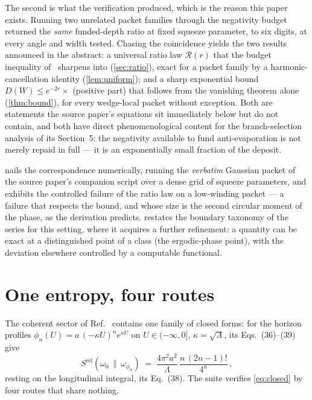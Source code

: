 \documentclass[11pt,a4paper]{article}
\newcommand{\Srel}{S^{\mathrm{rel}}}
\theoremstyle{plain}
\theoremstyle{definition}
\begin{document}
The second is what the verification produced, which is the reason this paper
exists. Running two unrelated packet families through the negativity budget
returned the \emph{same} funded-depth ratio at fixed squeeze parameter, to
six digits, at every angle and width tested. Chasing the coincidence yields
the two results announced in the abstract: a universal ratio law
$\mathcal{R}(r)$ that the budget inequality of~\cite{NariaiI} sharpens into
(\cref{sec:ratio}), exact for a packet family by a harmonic-cancellation
identity (\cref{lem:uniform}); and a sharp exponential bound
$D(W) \le e^{-2r} \times$ (positive part) that follows from the vanishing
theorem alone (\cref{thm:bound}), for every wedge-local packet without
exception. Both are statements the source paper's equations sit immediately
below but do not contain, and both have direct phenomenological content for
the branch-selection analysis of its Section~5: the negativity available to
fund anti-evaporation is not merely repaid in full --- it is an exponentially
small fraction of the deposit.

 nails the correspondence numerically, running the
\emph{verbatim} Gaussian packet of the source paper's companion script over a
dense grid of squeeze parameters, and exhibits the controlled failure of the
ratio law on a low-winding packet --- a failure that respects the bound, and
whose size is the second circular moment of the phase, as the derivation
predicts.  restates the boundary taxonomy of the series
for this setting, where it acquires a further refinement: a quantity can be
exact at a distinguished point of a class (the ergodic-phase point), with the
deviation elsewhere controlled by a computable functional.


\section{One entropy, four routes}
\label{sec:routes}

The coherent sector of Ref.~\cite{NariaiI} contains one family of closed
forms: for the horizon profiles
$\phi_n(U) = a\,(-\kappa U)^n e^{\kappa U}$ on $U \in (-\infty, 0]$,
$\kappa = \sqrt{\Lambda}$, its Eqs.~(36)--(39) give
%
\begin{equation}
\Srel(\omega_0 \,\|\, \omega_{\phi_n})
\;=\; \frac{4\pi^2 a^2}{\Lambda}\,\frac{n\,(2n-1)!}{4^n}\,,
\label{eq:closed}
\end{equation}
%
resting on the longitudinal integral, its Eq.~(38). The suite verifies
\cref{eq:closed} by four routes that share nothing.
\end{document}
